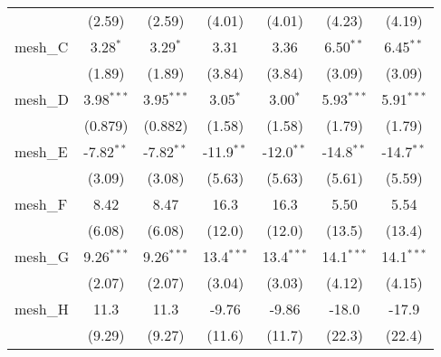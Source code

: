 \begin{tabular}{lcccccc}
                                                               & (2.59)         & (2.59)         & (4.01)        & (4.01)        & (4.23)        & (4.19)\\   
   mesh\_C                                                     & 3.28$^{*}$     & 3.29$^{*}$     & 3.31          & 3.36          & 6.50$^{**}$   & 6.45$^{**}$\\   
                                                               & (1.89)         & (1.89)         & (3.84)        & (3.84)        & (3.09)        & (3.09)\\   
   mesh\_D                                                     & 3.98$^{***}$   & 3.95$^{***}$   & 3.05$^{*}$    & 3.00$^{*}$    & 5.93$^{***}$  & 5.91$^{***}$\\   
                                                               & (0.879)        & (0.882)        & (1.58)        & (1.58)        & (1.79)        & (1.79)\\   
   mesh\_E                                                     & -7.82$^{**}$   & -7.82$^{**}$   & -11.9$^{**}$  & -12.0$^{**}$  & -14.8$^{**}$  & -14.7$^{**}$\\   
                                                               & (3.09)         & (3.08)         & (5.63)        & (5.63)        & (5.61)        & (5.59)\\   
   mesh\_F                                                     & 8.42           & 8.47           & 16.3          & 16.3          & 5.50          & 5.54\\   
                                                               & (6.08)         & (6.08)         & (12.0)        & (12.0)        & (13.5)        & (13.4)\\   
   mesh\_G                                                     & 9.26$^{***}$   & 9.26$^{***}$   & 13.4$^{***}$  & 13.4$^{***}$  & 14.1$^{***}$  & 14.1$^{***}$\\   
                                                               & (2.07)         & (2.07)         & (3.04)        & (3.03)        & (4.12)        & (4.15)\\   
   mesh\_H                                                     & 11.3           & 11.3           & -9.76         & -9.86         & -18.0         & -17.9\\   
                                                               & (9.29)         & (9.27)         & (11.6)        & (11.7)        & (22.3)        & (22.4)\\   

\end{tabular}
